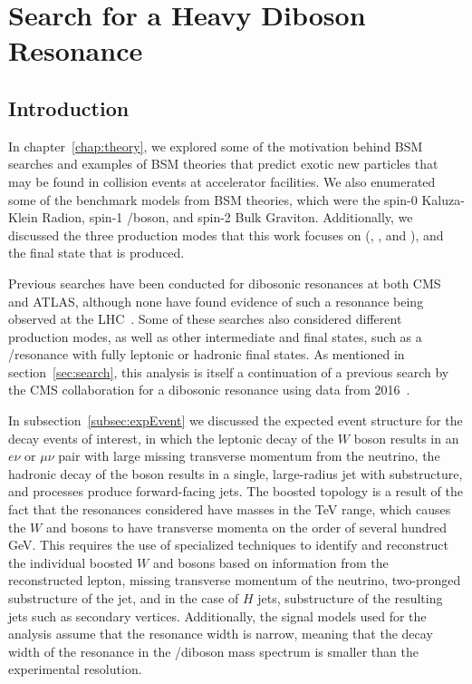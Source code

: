 
\chapter{Search for a Heavy Diboson Resonance}
\label{chap:analysis}

\section{Introduction}

In chapter~\ref{chap:theory}, we explored some of the motivation behind BSM searches and examples of BSM theories that predict exotic new particles that may be found in collision events at accelerator facilities.
We also enumerated some of the benchmark models from BSM theories, which were the spin-0 Kaluza-Klein Radion, spin-1 \Wpr/\Zpr boson, and spin-2 Bulk Graviton.
Additionally, we discussed the three production modes that this work focuses on (\VBF, \ggF, and \DY), and the final state that is produced.

Previous searches have been conducted for dibosonic resonances at both CMS and ATLAS, although none have found evidence of such a resonance being observed at the LHC~\cite{Aaboud_18,Aaboud_18_2,Aad_15,Khachatryan_14,Sirunyan_17,Sirunyan_17_2,Aad:2020ddw}.
Some of these searches also considered different production modes, as well as other intermediate and final states, such as a \ZZ/\ZH resonance with fully leptonic or hadronic final states.
As mentioned in section~\ref{sec:search}, this analysis is itself a continuation of a previous search by the CMS collaboration for a dibosonic resonance using data from 2016~\cite{Sirunyan_18}.

In subsection~\ref{subsec:expEvent} we discussed the expected event structure for the decay events of interest, in which the leptonic decay of the $W$ boson results in an $e\nu$ or $\mu\nu$ pair with large missing transverse momentum from the neutrino, the hadronic decay of the \VorH boson results in a single, large-radius jet with substructure, and \VBF processes produce forward-facing jets.
The boosted topology is a result of the fact that the resonances considered have masses in the TeV range, which causes the $W$ and \VorH bosons to have transverse momenta on the order of several hundred GeV.
This requires the use of specialized techniques to identify and reconstruct the individual boosted $W$ and \VorH bosons based on information from the reconstructed lepton, missing transverse momentum of the neutrino, two-pronged substructure of the jet, and in the case of $H$ jets, substructure of the resulting \bbbar jets such as secondary vertices.
Additionally, the signal models used for the analysis assume that the resonance width is narrow, meaning that the decay width of the resonance in the \WV/\WH diboson mass spectrum is smaller than the experimental resolution.

